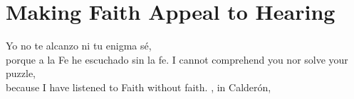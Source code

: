 

\chapter{Making Faith Appeal to Hearing}
\label{ch:faith-hearing}

\epigraphTranslation
{Yo no te alcanzo ni tu enigma sé, \\ 
porque a la Fe he escuchado sin la fe.}
{I cannot comprehend you nor solve your puzzle, \\
because I have listened to Faith without faith.}
{, in Calderón, }


